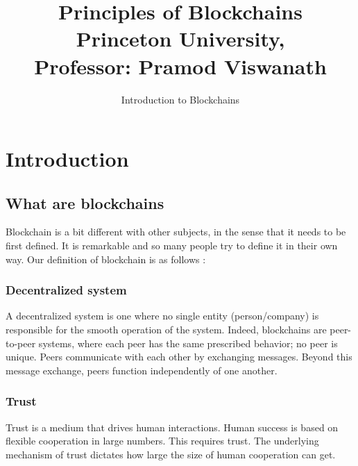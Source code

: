 \documentclass{report}
\title{\Huge{Principles of Blockchains \\ Princeton University,\\
		Professor: Pramod Viswanath}}
\author{\huge{Introduction to Blockchains}}
\begin{document}
\maketitle
\newpage%
\tableofcontents
\pagebreak

\chapter{Introduction}
\section{What are blockchains}
Blockchain is a bit different with other subjects, in the sense that it needs to be first defined. It is remarkable and so many people try to define it in their own way. Our definition of blockchain is as follows :

\subsection*{Decentralized system}
A decentralized system is one where no single entity (person/company)
is responsible for the smooth operation of the system. Indeed, blockchains are peer-to-peer systems,
where each peer has the same prescribed behavior; no peer is unique. Peers communicate with each
other by exchanging messages. Beyond this message exchange, peers function independently of one
another.

\subsection*{Trust}
Trust is a medium that drives human interactions. Human success is based on flexible cooperation in large numbers. This requires trust. The underlying mechanism of trust dictates how large the size of human cooperation can get. 
\end{document}
